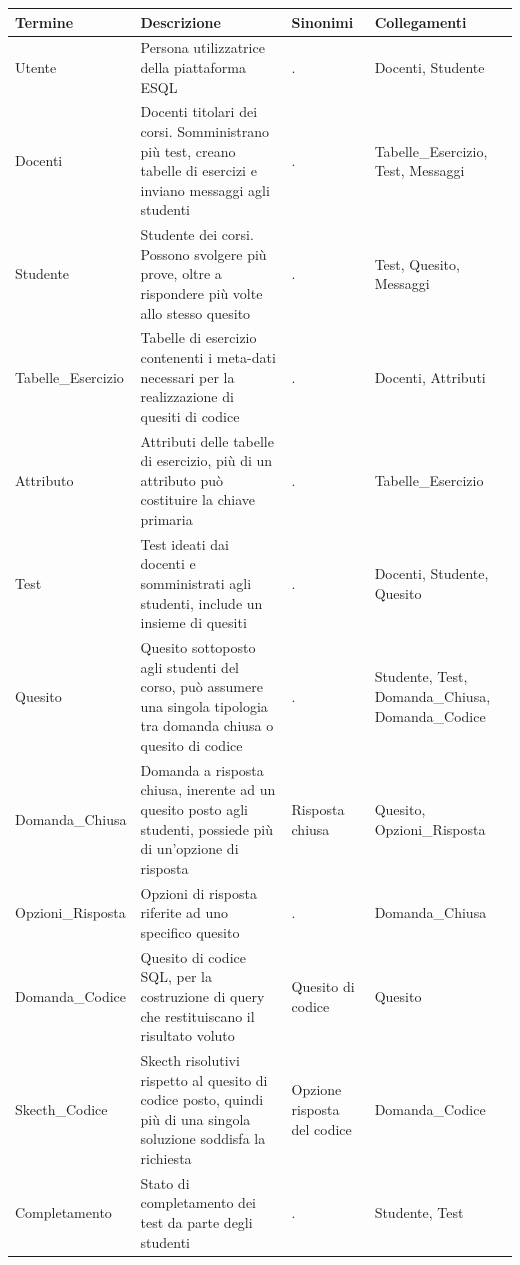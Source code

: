 \documentclass{article}
\begin{document}
\begin{table}[H]
    \centering
       \begin{tabularx}{\textwidth}{|X|p{6cm}|X|X|}
        \hline
        \bf Termine & \bf Descrizione & \bf Sinonimi & \bf Collegamenti \\
        \hline
        Utente & Persona utilizzatrice della piattaforma ESQL & . & Docenti, Studente \\
        \hline
        Docenti & Docenti titolari dei corsi. Somministrano più test, creano tabelle di esercizi e inviano messaggi agli studenti & . & Tabelle\_Esercizio, Test, Messaggi \\
        \hline
        Studente & Studente dei corsi. Possono svolgere più prove, oltre a rispondere più volte allo stesso quesito & . & Test, Quesito, Messaggi \\
        \hline
        Tabelle\_Esercizio & Tabelle di esercizio contenenti i meta-dati necessari per la realizzazione di quesiti di codice & . & Docenti, Attributi \\
        \hline
        Attributo & Attributi delle tabelle di esercizio, più di un attributo può costituire la chiave primaria & . & Tabelle\_Esercizio \\
        \hline
        Test & Test ideati dai docenti e somministrati agli studenti, include un insieme di quesiti & . & Docenti, Studente, Quesito \\
        \hline 
        Quesito & Quesito sottoposto agli studenti del corso, può assumere una singola tipologia tra domanda chiusa o quesito di codice & . & Studente, Test, Domanda\_Chiusa, Domanda\_Codice \\
        \hline
        Domanda\_Chiusa & Domanda a risposta chiusa, inerente ad un quesito posto agli studenti, possiede più di un'opzione di risposta & Risposta chiusa & Quesito, Opzioni\_Risposta \\
        \hline
        Opzioni\_Risposta & Opzioni di risposta riferite ad uno specifico quesito & . & Domanda\_Chiusa \\
        \hline
        Domanda\_Codice & Quesito di codice SQL, per la costruzione di query che restituiscano il risultato voluto & Quesito di codice & Quesito \\
        \hline
        Skecth\_Codice & Skecth risolutivi rispetto al quesito di codice posto, quindi più di una singola soluzione soddisfa la richiesta & Opzione risposta del codice & Domanda\_Codice \\
        \hline
        Completamento & Stato di completamento dei test da parte degli studenti & . & Studente, Test \\

\end{tabularx}
\end{table}
\end{document}
